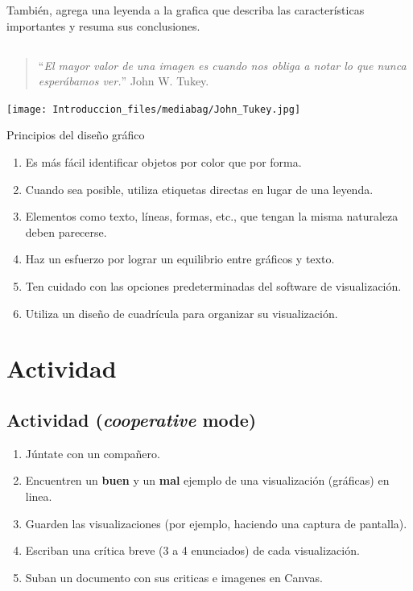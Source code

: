 \documentclass[
  letterpaper,
  DIV=11,
  numbers=noendperiod]{scrartcl}
\providecommand{\tightlist}{%
  \setlength{\itemsep}{0pt}\setlength{\parskip}{0pt}}\usepackage{longtable,booktabs,array}
\begin{document}
También, agrega una leyenda a la grafica que describa las
características importantes y resuma sus conclusiones.

\hypertarget{section-2}{%
\subsection{}\label{section-2}}

\begin{quote}
``\emph{El mayor valor de una imagen es cuando nos obliga a notar lo que
nunca esperábamos ver.}'' John W. Tukey.
\end{quote}

\texttt{[image: Introduccion\_files/mediabag/John\_Tukey.jpg]}

Principios del diseño gráfico

\begin{enumerate}
\def\labelenumi{\arabic{enumi}.}
\item
  Es más fácil identificar objetos por color que por forma.
\item
  Cuando sea posible, utiliza etiquetas directas en lugar de una
  leyenda.
\item
  Elementos como texto, líneas, formas, etc., que tengan la misma
  naturaleza deben parecerse.
\item
  Haz un esfuerzo por lograr un equilibrio entre gráficos y texto.
\item
  Ten cuidado con las opciones predeterminadas del software de
  visualización.
\item
  Utiliza un diseño de cuadrícula para organizar su visualización.
\end{enumerate}

\hypertarget{actividad}{%
\section{Actividad}\label{actividad}}

\hypertarget{actividad-cooperative-mode}{%
\subsection{\texorpdfstring{Actividad (\emph{cooperative}
mode)}{Actividad (cooperative mode)}}\label{actividad-cooperative-mode}}

\begin{enumerate}
\def\labelenumi{\arabic{enumi}.}
\tightlist
\item
  Júntate con un compañero.
\item
  Encuentren un \textbf{buen} y un \textbf{mal} ejemplo de una
  visualización (gráficas) en linea.
\item
  Guarden las visualizaciones (por ejemplo, haciendo una captura de
  pantalla).
\item
  Escriban una crítica breve (3 a 4 enunciados) de cada visualización.
\item
  Suban un documento con sus criticas e imagenes en Canvas.
\end{enumerate}
\end{document}

